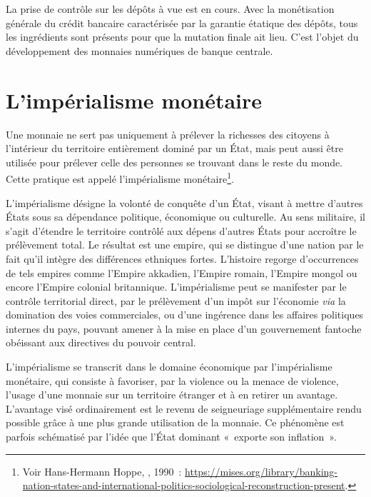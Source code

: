 La prise de contrôle sur les dépôts à vue est en cours. Avec la monétisation générale du crédit bancaire caractérisée par la garantie étatique des dépôts, tous les ingrédients sont présents pour que la mutation finale ait lieu. C'est l'objet du développement des monnaies numériques de banque centrale.

\section{L'impérialisme monétaire} %

Une monnaie ne sert pas uniquement à prélever la richesses des citoyens à l'intérieur du territoire entièrement dominé par un État, mais peut aussi être utilisée pour prélever celle des personnes se trouvant dans le reste du monde. Cette pratique est appelé l'impérialisme monétaire\footnote{Voir Hans-Hermann Hoppe, , 1990~: \url{https://mises.org/library/banking-nation-states-and-international-politics-sociological-reconstruction-present}.}.

L'impérialisme désigne la volonté de conquête d'un État, visant à mettre d'autres États sous sa dépendance politique, économique ou culturelle. Au sens militaire, il s'agit d'étendre le territoire contrôlé aux dépens d'autres États pour accroître le prélèvement total. Le résultat est une empire, qui se distingue d'une nation par le fait qu'il intègre des différences ethniques fortes. L'histoire regorge d'occurrences de tels empires comme l'Empire akkadien, l'Empire romain, l'Empire mongol ou encore l'Empire colonial britannique. L'impérialisme peut se manifester par le contrôle territorial direct, par le prélèvement d'un impôt sur l'économie \emph{via} la domination des voies commerciales, ou d'une ingérence dans les affaires politiques internes du pays, pouvant amener à la mise en place d'un gouvernement fantoche obéissant aux directives du pouvoir central.

L'impérialisme se transcrit dans le domaine économique par l'impérialisme monétaire, qui consiste à favoriser, par la violence ou la menace de violence, l'usage d'une monnaie sur un territoire étranger et à en retirer un avantage. L'avantage visé ordinairement est le revenu de seigneuriage supplémentaire rendu possible grâce à une plus grande utilisation de la monnaie. Ce phénomène est parfois schématisé par l'idée que l'État dominant «~exporte son inflation~».

